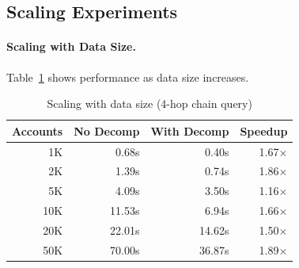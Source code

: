 





\subsection{Scaling Experiments}
\label{sec:evaluation:scaling}

\paragraph{Scaling with Data Size.}
Table~\ref{tab:scaling} shows performance as data size increases.

\begin{table}[t]
\centering
\caption{Scaling with data size (4-hop chain query)}
\label{tab:scaling}
\begin{tabular}{rrrr}
\toprule
\textbf{Accounts} & \textbf{No Decomp} & \textbf{With Decomp} & \textbf{Speedup} \\
\midrule
1K & 0.68s & 0.40s & 1.67$\times$ \\
2K & 1.39s & 0.74s & 1.86$\times$ \\
5K & 4.09s & 3.50s & 1.16$\times$ \\
10K & 11.53s & 6.94s & 1.66$\times$ \\
20K & 22.01s & 14.62s & 1.50$\times$ \\
50K & 70.00s & 36.87s & 1.89$\times$ \\
\bottomrule
\end{tabular}
\end{table}

